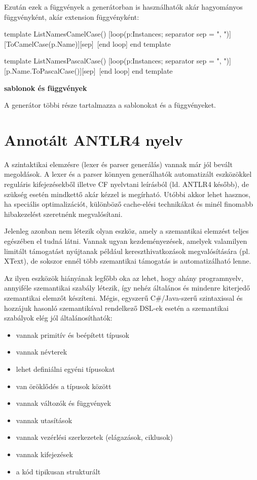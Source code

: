 \documentclass[12pt, a4paper]{report}
\newcommand{\bb}[1]{\textbf{#1}}
\begin{document}
Ezután ezek a függvények a generátorban is használhatók akár hagyományos függvényként, akár extension függvényként:

\begin{mgencode}
template ListNamesCamelCase()
  [loop(p:Instances; separator sep = ", ")]
[ToCamelCase(p.Name)][sep]\
  [end loop]
end template

template ListNamesPascalCase()
  [loop(p:Instances; separator sep = ", ")]
[p.Name.ToPascalCase()][sep]\
  [end loop]
end template
\end{mgencode}

\bb{sablonok és függvények}

A generátor többi része tartalmazza a sablonokat és a függvényeket.


\chapter{Annotált ANTLR4 nyelv}

A szintaktikai elemzésre (lexer és parser generálás) vannak már jól bevált megoldások. A lexer és a parser könnyen generálhatók automatizált eszközökkel reguláris kifejezésekből illetve CF nyelvtani leírásból (ld. ANTLR4 később), de szükség esetén mindkettő akár kézzel is megírható. Utóbbi akkor lehet hasznos, ha speciális optimalizációt, különböző cache-elési technikákat és minél finomabb hibakezelést szeretnénk megvalósítani.

Jelenleg azonban nem létezik olyan eszköz, amely a szemantikai elemzést teljes egészében el tudná látni. Vannak ugyan kezdeményezések, amelyek valamilyen limitált támogatást nyújtanak például kereszthivatkozások megvalósítására (pl. XText), de sokszor ennél több szemantikai támogatás is automatizálható lenne.

Az ilyen eszközök hiányának legfőbb oka az lehet, hogy ahány programnyelv, annyiféle szemantikai szabály létezik, így nehéz általános és mindenre kiterjedő szemantikai elemzőt készíteni. Mégis, egyszerű C\#/Java-szerű szintaxissal és hozzájuk hasonló szemantikával rendelkező DSL-ek esetén a szemantikai szabályok elég jól általánosíthatók:
\begin{itemize}
	\item vannak primitív és beépített típusok
	\item vannak névterek
	\item lehet definiálni egyéni típusokat
	\item van öröklődés a típusok között
	\item vannak változók és függvények
	\item vannak utasítások
	\item vannak vezérlési szerkezetek (elágazások, ciklusok)
	\item vannak kifejezések
	\item a kód tipikusan strukturált
\end{itemize}
\end{document}
